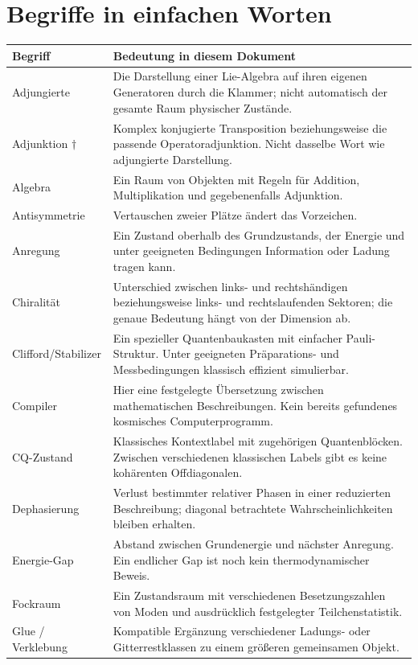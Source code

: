 \chapter{Begriffe in einfachen Worten}
\begin{longtable}{L{34mm}L{116mm}}
\toprule \textbf{Begriff}&\textbf{Bedeutung in diesem Dokument}\\\midrule\endhead
Adjungierte&Die Darstellung einer Lie-Algebra auf ihren eigenen Generatoren durch die Klammer; nicht automatisch der gesamte Raum physischer Zustände.\\
Adjunktion $\dagger$&Komplex konjugierte Transposition beziehungsweise die passende Operatoradjunktion. Nicht dasselbe Wort wie adjungierte Darstellung.\\
Algebra&Ein Raum von Objekten mit Regeln für Addition, Multiplikation und gegebenenfalls Adjunktion.\\
Antisymmetrie&Vertauschen zweier Plätze ändert das Vorzeichen.\\
Anregung&Ein Zustand oberhalb des Grundzustands, der Energie und unter geeigneten Bedingungen Information oder Ladung tragen kann.\\
Chiralität&Unterschied zwischen links- und rechtshändigen beziehungsweise links- und rechtslaufenden Sektoren; die genaue Bedeutung hängt von der Dimension ab.\\
Clifford/Stabilizer&Ein spezieller Quantenbaukasten mit einfacher Pauli-Struktur. Unter geeigneten Präparations- und Messbedingungen klassisch effizient simulierbar.\\
Compiler&Hier eine festgelegte Übersetzung zwischen mathematischen Beschreibungen. Kein bereits gefundenes kosmisches Computerprogramm.\\
CQ-Zustand&Klassisches Kontextlabel mit zugehörigen Quantenblöcken. Zwischen verschiedenen klassischen Labels gibt es keine kohärenten Offdiagonalen.\\
Dephasierung&Verlust bestimmter relativer Phasen in einer reduzierten Beschreibung; diagonal betrachtete Wahrscheinlichkeiten bleiben erhalten.\\
Energie-Gap&Abstand zwischen Grundenergie und nächster Anregung. Ein endlicher Gap ist noch kein thermodynamischer Beweis.\\
Fockraum&Ein Zustandsraum mit verschiedenen Besetzungszahlen von Moden und ausdrücklich festgelegter Teilchenstatistik.\\
Glue / Verklebung&Kompatible Ergänzung verschiedener Ladungs- oder Gitterrestklassen zu einem größeren gemeinsamen Objekt.\\

\end{longtable}
